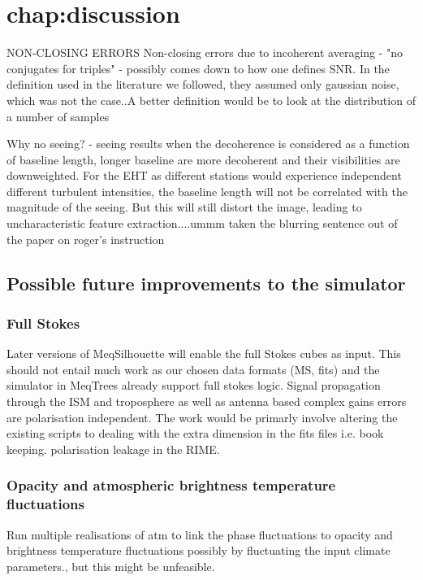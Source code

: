 \chapter{chap:discussion}

NON-CLOSING ERRORS
Non-closing errors due to incoherent averaging - "no conjugates for triples" - possibly comes down to how one defines SNR. In the definition used in the literature we followed, they assumed only gaussian noise, which was not the case..A better definition would be to look at the distribution of a number of samples 


Why no seeing? - seeing results when the decoherence is considered as a function of baseline length, longer baseline are more decoherent and their visibilities are downweighted. For the EHT as different stations would experience independent different turbulent intensities, the baseline length will not be correlated with the magnitude of the seeing. But this will still distort the image, leading to uncharacteristic feature extraction....ummm taken the blurring sentence out of the paper on roger's instruction



\section{Possible future improvements to the simulator}

\subsection{Full Stokes}

Later versions of {\sc MeqSilhouette} will enable the full Stokes cubes as input. This should not entail much work as our chosen data formats (MS, {\sc fits}) and the simulator in {\sc MeqTrees} already support full stokes logic. Signal propagation through the ISM and troposphere as well as antenna based complex gains errors are polarisation independent. The work would be primarly involve altering the existing scripts to dealing with the extra dimension in the {\sc fits} files i.e. book keeping. 
polarisation leakage in the RIME.

\subsection{Opacity and atmospheric brightness temperature fluctuations}

Run multiple realisations of atm to link the phase fluctuations to opacity and brightness temperature fluctuations possibly by fluctuating the input climate parameters., but this might be unfeasible.
